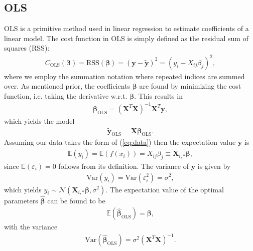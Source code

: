 \documentclass[%
reprint,
amsmath,amssymb,
aps,
pra,
]{revtex4-2}
\begin{document}
\subsection{OLS}	
\label{sec:THEORY_OLS}
OLS is a primitive method used in linear regression to estimate coefficients of a linear model. The cost function in OLS is simply defined as the residual sum of squares (RSS):
\begin{align*}
	C_\text{OLS}(\bm\beta)=\text{RSS}(\bm\beta)=(\bm y-\tilde{\bm y})^2=(y_i-X_{ij}\beta_j)^2,
\end{align*}
where we employ the summation notation where repeated indices are summed over. As mentioned prior, the coefficients $\bm\beta$ are found by minimizing the cost function, i.e. taking the derivative w.r.t. $\bm\beta$. This results in
\begin{align*}
	\bm\beta_\text{OLS}=(\bm X^T\bm X)^{-1}\bm X^T\bm y,
\end{align*}
which yields the model
\begin{align}
	\tilde{\bm y}_\text{OLS}=\bm X\bm \beta_\text{OLS}.
\end{align}
Assuming our data takes the form of (\ref{eq:data}) then the expectation value $\bm y$ is
\begin{align*}
	\mathbb{E}(y_i)=\mathbb{E}(f(x_i))=X_{ij}\beta_j\equiv\bm X_{i,*}\bm\beta,
\end{align*}
since $\mathbb{E}(\varepsilon_i)=0$ follows from its definition. The variance of $\bm y$ is given by
\begin{align*}
	\text{Var}(y_i)=\text{Var}(\varepsilon_i^2)=\sigma^2,
\end{align*}
which yields $y_i\sim\mathcal{N}(\bm X_{i,*}\bm\beta,\sigma^2)$. The expectation value of the optimal parameters $\hat{\bm\beta}$ can be found to be
\begin{align*}
	\mathbb{E}(\hat{\bm\beta}_\text{OLS})=\bm\beta,
\end{align*}
with the variance
\begin{align*}
	\text{Var}(\hat{\bm\beta}_\text{OLS})=\sigma^2(\bm X^T \bm X)^{-1}.
\end{align*}
\end{document}
